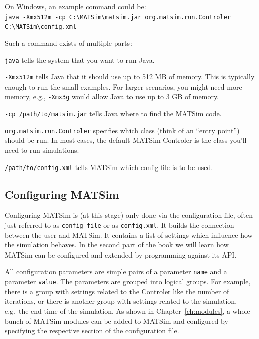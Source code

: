 On Windows, an example command could be: \\
\lstinline|java -Xmx512m -cp C:\MATSim\matsim.jar org.matsim.run.Controler C:\MATSim\config.xml|

Such a command exists of multiple parts:
\begin{compactitem}
\item \lstinline|java| tells the system that you want to run Java.
\item \lstinline|-Xmx512m| tells Java that it should use up to 512 MB of memory. This is typically enough to run the small examples. For larger scenarios, you might need more memory, e.g., \lstinline|-Xmx3g| would allow Java to use up to 3 GB of memory.
\item \lstinline|-cp /path/to/matsim.jar| tells Java where to find the MATSim code.
\item \lstinline|org.matsim.run.Controler| specifies which class (think of an ``entry point'') should be run. In most cases, the default MATSim Controler is the class you'll need to run simulations.
\item \lstinline|/path/to/config.xml| tells MATSim which config file is to be used.
\end{compactitem}

\subsection{Configuring MATSim}
\label{sec:config}

Configuring MATSim is (at this stage) only done via the configuration file, often just referred to as \lstinline|config file| or as \lstinline|config.xml|. It builds the connection between the user and MATSim. It contains a list of settings which influence how the simulation behaves. In the second part of the book we will learn how MATSim can be configured and extended by programming against its API.

All configuration parameters are simple pairs of a parameter \lstinline|name| and a parameter \lstinline|value|. The parameters are grouped into logical groups. For example, there is a group with settings related to the Controler like the number of iterations, or there is another group with settings related to the simulation, e.g.\ the end time of the simulation. As shown in Chapter~\ref{ch:modules}, a whole bunch of MATSim modules can be added to MATSim and configured by specifying the respective section of the configuration file.

